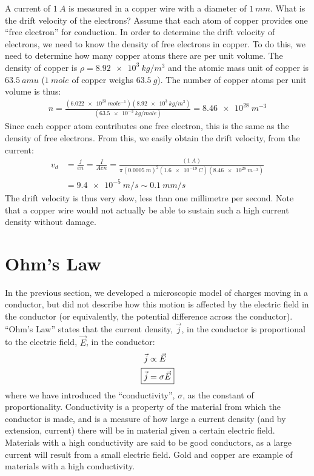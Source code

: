 \begin{example}{A current of $\SI{1}{A}$ is measured in a copper wire with a diameter of $\SI{1}{mm}$. What is the drift velocity of the electrons? Assume that each atom of copper provides one ``free electron'' for conduction.}
In order to determine the drift velocity of electrons, we need to know the density of free electrons in copper. To do this, we need to determine how many copper atoms there are per unit volume. The density of copper is $\rho=\SI{8.92e3}{kg/m^3}$ and the atomic mass unit of copper is $\SI{63.5}{amu}$ ($\SI{1}{mole}$ of copper weighs $\SI{63.5}{g}$). The number of copper atoms per unit volume is thus:
\begin{align*}
n=\frac{(\SI{6.022e23}{mole^{-1}})(\SI{8.92e3}{kg/m^3})}{(\SI{63.5e-3}{kg/mole})}=\SI{8.46e28}{m^{-3}}
\end{align*}
Since each copper atom contributes one free electron, this is the same as the density of free electrons. From this, we easily obtain the drift velocity, from the current:
\begin{align*}
v_d&=\frac{j}{en}=\frac{I}{Aen}=\frac{(\SI{1}{A})}{\pi(\SI{0.0005}{m})^2(\SI{1.6e-19}{C})(\SI{8.46e28}{m^{-3}})}\\
&=\SI{9.4e-5}{m/s}\sim\SI{0.1}{mm/s}
\end{align*}
The drift velocity is thus very slow, less than one millimetre per second. Note that a copper wire would not actually be able to sustain such a high current density without damage.
\end{example}


\section{Ohm's Law}
In the previous section, we developed a microscopic model of charges moving in a conductor, but did not describe how this motion is affected by the electric field in the conductor (or equivalently, the potential difference across the conductor). ``Ohm's Law'' states that the current density, $\vec j$, in the conductor is proportional to the electric field, $\vec E$, in the conductor:
\begin{align*}
\vec j &\propto \vec E\\
\Aboxed{\vec j &= \sigma \vec E}
\end{align*}
where we have introduced the ``conductivity'', $\sigma$, as the constant of proportionality. Conductivity is a property of the material from which the conductor is made, and is a measure of how large a current density (and by extension, current) there will be in material given a certain electric field. Materials with a high conductivity are said to be good conductors, as a large current will result from a small electric field. Gold and copper are example of materials with a high conductivity. 
 
